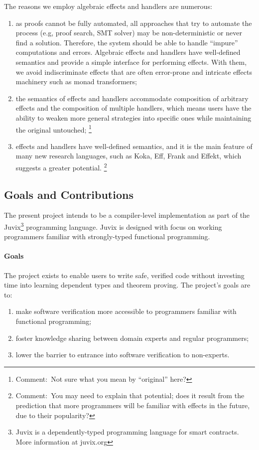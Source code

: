 \documentclass[sigconfl]{acmart}
\newcommand{\comment}[1]{\footnote{Comment:~#1}}
\begin{document}
The reasons we employ algebraic effects and handlers are numerous:
\begin{enumerate}
\item as proofs cannot be fully automated, all approaches that try to automate
  the process (e.g, proof search, SMT solver) may be non-deterministic or
  never find a solution. Therefore, the system should be able to handle
  ``impure'' computations and errors. Algebraic effects and handlers have
  well-defined semantics and provide a simple interface for performing effects.
  With them, we avoid indiscriminate effects that are often error-prone and
  intricate effects machinery such as monad transformers;
\item the semantics of effects and handlers accommodate composition of arbitrary effects and the
  composition of multiple handlers, which means users have the ability to weaken
  more general strategies into specific ones while maintaining the original untouched;
  \comment{Not sure what you mean by ``original'' here?}
\item effects and handlers have well-defined semantics, and it is the main feature of many new
  research languages, such as Koka, Eff, Frank and Effekt, which suggests a greater
  potential.
  \comment{You may need to explain that potential; does it result from the
    prediction that more programmers will be familiar with effects in the
    future, due to their popularity?}
\end{enumerate}

\subsection{Goals and Contributions}

The present project intends to be a compiler-level implementation as part of the
Juvix\footnote{Juvix is a dependently-typed programming language for smart
  contracts. More information at juvix.org} programming language. Juvix is designed
with focus on working programmers familiar with strongly-typed functional
programming.

\paragraph{Goals} The project exists to enable users to write safe, verified
code without investing time into learning dependent types and theorem proving.
The project's goals are to:
\begin{enumerate}
\item make software verification more accessible to programmers familiar with
  functional programming;
\item foster knowledge sharing between domain experts and regular programmers;
\item lower the barrier to entrance into software verification to non-experts.
\end{enumerate}
\end{document}
